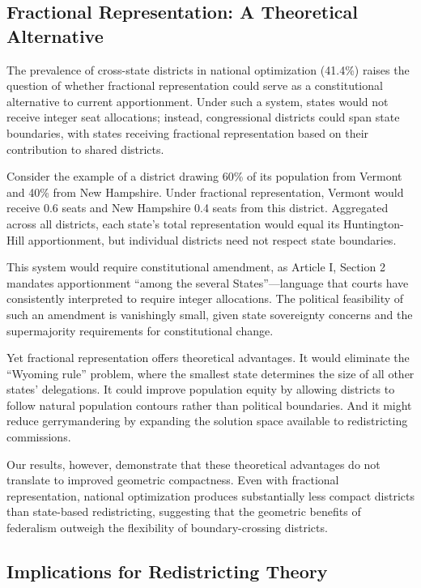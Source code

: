 \subsection{Fractional Representation: A Theoretical Alternative}

The prevalence of cross-state districts in national optimization (41.4\%) raises the question of whether fractional representation could serve as a constitutional alternative to current apportionment. Under such a system, states would not receive integer seat allocations; instead, congressional districts could span state boundaries, with states receiving fractional representation based on their contribution to shared districts.

Consider the example of a district drawing 60\% of its population from Vermont and 40\% from New Hampshire. Under fractional representation, Vermont would receive 0.6 seats and New Hampshire 0.4 seats from this district. Aggregated across all districts, each state's total representation would equal its Huntington-Hill apportionment, but individual districts need not respect state boundaries.

This system would require constitutional amendment, as Article I, Section 2 mandates apportionment ``among the several States''---language that courts have consistently interpreted to require integer allocations. The political feasibility of such an amendment is vanishingly small, given state sovereignty concerns and the supermajority requirements for constitutional change.

Yet fractional representation offers theoretical advantages. It would eliminate the ``Wyoming rule'' problem, where the smallest state determines the size of all other states' delegations. It could improve population equity by allowing districts to follow natural population contours rather than political boundaries. And it might reduce gerrymandering by expanding the solution space available to redistricting commissions.

Our results, however, demonstrate that these theoretical advantages do not translate to improved geometric compactness. Even with fractional representation, national optimization produces substantially less compact districts than state-based redistricting, suggesting that the geometric benefits of federalism outweigh the flexibility of boundary-crossing districts.

\subsection{Implications for Redistricting Theory}

